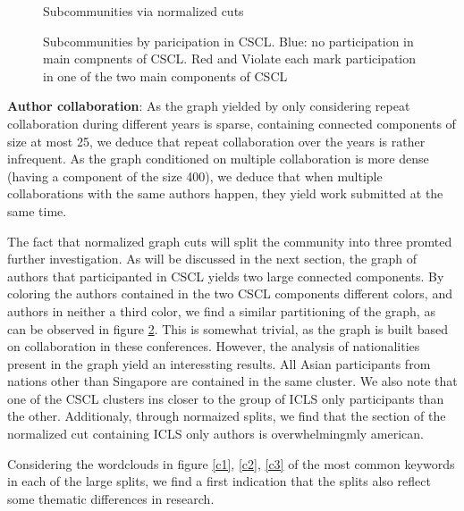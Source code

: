 \documentclass[article,twocolumn]{IEEEtran}
\begin{document}
    \begin{figure}
        \begin{center}\end{center}
        \caption{Subcommunities via normalized cuts}
        \label{normalized}
    \end{figure}
    

    \begin{figure}
        \begin{center}\end{center}
        \caption{Subcommunities by paricipation in CSCL. Blue: no participation in main compnents of CSCL. Red and Violate each mark participation in one of the two main components of CSCL}
        \label{CSCL_components}
    \end{figure}
    
    \textbf{Author collaboration}: As the graph yielded by only considering
repeat collaboration during different years is sparse, containing
connected components of size at most 25, we deduce that repeat
collaboration over the years is rather infrequent. As the graph
conditioned on multiple collaboration is more dense (having a component
of the size 400), we deduce that when multiple collaborations with the
same authors happen, they yield work submitted at the same time.

The fact that normalized graph cuts will split the community into three
promted further investigation. As will be discussed in the next section,
the graph of authors that participanted in CSCL yields two large
connected components. By coloring the authors contained in the two CSCL
components different colors, and authors in neither a third color, we
find a similar partitioning of the graph, as can be observed in figure
\ref{CSCL_components}. This is somewhat trivial, as the graph is built
based on collaboration in these conferences. However, the analysis of
nationalities present in the graph yield an interessting results. All
Asian participants from nations other than Singapore are contained in
the same cluster. We also note that one of the CSCL clusters ins closer
to the group of ICLS only participants than the other. Additionaly,
through normaized splits, we find that the section of the normalized cut
containing ICLS only authors is overwhelmingmly american.

Considering the wordclouds in figure \ref{c1}, \ref{c2}, \ref{c3} of the
most common keywords in each of the large splits, we find a first
indication that the splits also reflect some thematic differences in
research.
\end{document}
